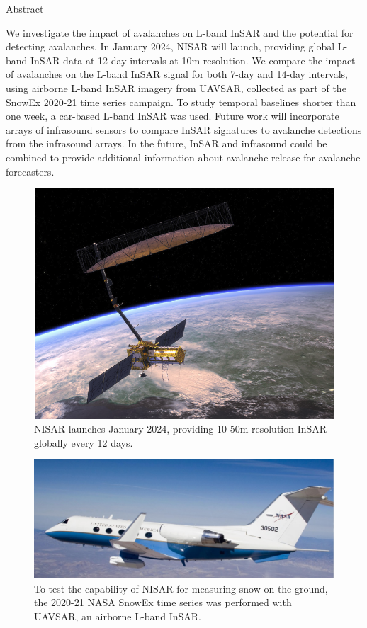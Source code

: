 \documentclass[landscape,a0b,final]{a0poster}
\newenvironment{sectionbox}[1]		%
{
\par 
\flushleft
\colorbox{boxcol}{ 				%
\sffamily\Large \color{white} #1                %
\hspace{0.5cm}}
\par\nobreak 
\nointerlineskip 				%
\setlength\parskip{-1pt}			%
\begin{lrbox}\envbox				%
\begin{minipage}{0.9\columnwidth}		%
}
{\par
\end{minipage}\end{lrbox}			%
\fcolorbox{boxcol}{fillcol}{\usebox\envbox}	%
\vspace{1cm}					%
}
\newenvironment{poster}{
  \begin{center}
    \begin{minipage}[c]{0.98\textwidth}
    }{
    \end{minipage} 
  \end{center}
}
\begin{document}
\begin{poster}
\thispagestyle{empty}
\begin{multicols}{4}		%

  
\begin{sectionbox}{Abstract}
\normalsize{We investigate the impact of avalanches on L-band InSAR and the potential for detecting avalanches.  In January 2024, NISAR will launch, providing global L-band InSAR data at 12 day intervals at 10m resolution.  We compare the impact of avalanches on the L-band InSAR signal for both 7-day and 14-day intervals, using airborne L-band InSAR imagery from UAVSAR, collected as part of the SnowEx 2020-21 time series campaign.  To study temporal baselines shorter than one week, a car-based L-band InSAR was used.  Future work will incorporate arrays of infrasound sensors to compare InSAR signatures to avalanche detections from the infrasound arrays.  In the future, InSAR and infrasound could be combined to provide additional information about avalanche release for avalanche forecasters.}

\end{sectionbox}

\begin{figure}
\centering
\includegraphics[width=0.8\columnwidth]{FIGURES2/NISAR.png}
\caption{NISAR launches January 2024, providing 10-50m resolution InSAR globally every 12 days.}
\label{fig:ProfileTrace} 
\end{figure}

\begin{figure}
\centering
\includegraphics[width=0.8\columnwidth]{FIGURES2/UAVSAR.png}
\caption{To test the capability of NISAR for measuring snow on the ground, the 2020-21 NASA SnowEx time series was performed with UAVSAR, an airborne L-band InSAR.}
\label{fig:ProfileTrace} 
\end{figure}



\end{multicols}
\end{poster}
\end{document}
